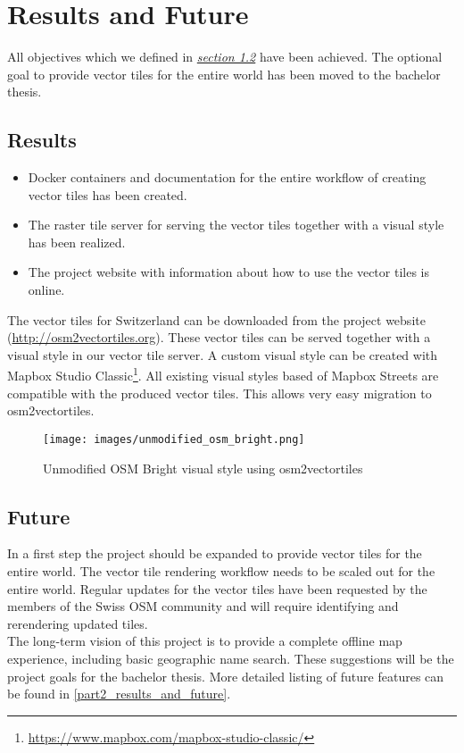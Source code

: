 \chapter{Results and Future}\label{part1_results_and_future}

All objectives which we defined in \hyperref[targets]{\emph{section 1.2}} have been achieved. The optional goal to provide vector tiles for the entire world has been moved to the bachelor thesis.

\section{Results}\label{part1_results}

\begin{itemize}
\item
  Docker containers and documentation for the entire workflow of creating vector tiles has been created.
\item
  The raster tile server for serving the vector tiles together with a visual style has been realized.
\item
  The project website with information about how to use the vector tiles is online.
\end{itemize}

The vector tiles for Switzerland can be downloaded from the project website (\url{http://osm2vectortiles.org}). These vector tiles can be served together with a visual style in our vector tile server.
\newline{}
A custom visual style can be created with Mapbox Studio Classic\footnote{\url{https://www.mapbox.com/mapbox-studio-classic/}}.
All existing visual styles based of Mapbox Streets are compatible with the produced vector tiles. This allows very easy migration to osm2vectortiles.

\begin{figure}[H]
  \texttt{[image: images/unmodified\_osm\_bright.png]}
  \caption{Unmodified OSM Bright visual style using osm2vectortiles}
\end{figure}

\section{Future}\label{part1_future}
In a first step the project should be expanded to provide vector tiles for the entire world. The vector tile rendering workflow needs to be scaled out for the entire world. Regular updates for the vector tiles have been requested by the members of the Swiss OSM community
and will require identifying and rerendering updated tiles.\\
The long-term vision of this project is to provide a complete offline map experience, including basic geographic name search. These suggestions will be the project goals for the bachelor thesis. More detailed listing of
future features can be found in \autoref{part2_results_and_future}.
